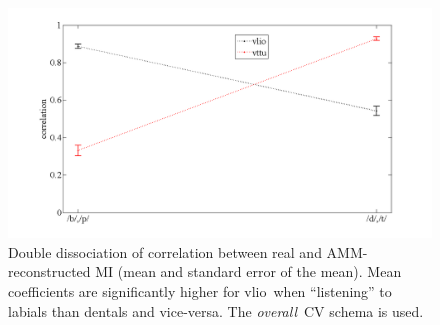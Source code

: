 \documentclass[10pt]{article}
\newcommand{\vlio}{\textsf{vlio}}
\newcommand{\overall}{\emph{overall}}
\begin{document}
\begin{figure}[t]
\renewcommand{\figurename}{Figure S}
  \centerline{\includegraphics[width=\textwidth]{figs/doubleDiss}}
  \caption{Double dissociation of correlation between real and AMM-reconstructed MI
    (mean and standard error of the mean). Mean coefficients are significantly
    higher for \vlio\ when ``listening'' to labials than dentals and vice-versa.
    The \overall\ CV schema is used.}
  \label{fig:DD}
\end{figure}
\end{document}
